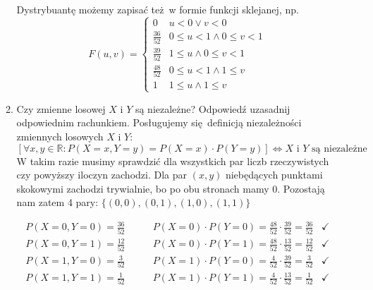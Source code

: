 \documentclass[twoside]{mwart}
\newenvironment{ansenv}{\comment}{\endcomment}
\newenvironment{ansenv}{\paragraph{Odpowiedź:}}{}
\begin{document}
\begin{enumerate}
\begin{enumerate}
\begin{ansenv}
	Dystrybuantę możemy zapisać też w formie funkcji sklejanej, np.
	\[F(u,v)=\begin{cases} 
	0 & u< 0 \lor v< 0 \\ 
	\frac{36}{52} & 0\leq u< 1 \land 0\leq v< 1 \\
	\frac{39}{52} & 1\leq u \land 0\leq v< 1 \\
	\frac{48}{52} & 0\leq u< 1 \land 1\leq v\\
	1 & 1\leq u \land 1\leq v
	\end{cases}\]
\end{ansenv}
\item Czy zmienne losowej $X$ i $Y$ są niezależne? Odpowiedź uzasadnij odpowiednim rachunkiem. 
\begin{ansenv}
	Posługujemy się definicją niezależności zmiennych losowych $X$ i $Y$:
	\[ \left[\forall x,y\in\mathbb{R}\colon P(X=x, Y=y)=P(X=x)\cdot P(Y=y) \right] \iff \text{$X$ i $Y$ są niezależne} \]
	W takim razie musimy sprawdzić dla wszystkich par liczb rzeczywistych czy powyższy iloczyn zachodzi.
	Dla par $(x, y)$ niebędących punktami skokowymi zachodzi trywialnie, bo po obu stronach mamy 0.
	Pozostają nam zatem 4 pary:  $\{(0,0), (0, 1), (1, 0), (1,1)\}$
	
	\begin{align*}
		P(X=0, Y=0)=\frac{36}{52} \qquad & P(X=0)\cdot P(Y=0)=\frac{48}{52}\cdot\frac{39}{52}=\frac{36}{52} & \checkmark \\
		P(X=0, Y=1)=\frac{12}{52} \qquad & P(X=0)\cdot P(Y=1)=\frac{48}{52}\cdot\frac{13}{52}=\frac{12}{52} & \checkmark \\
		P(X=1, Y=0)=\frac{3}{52} \qquad & P(X=1)\cdot P(Y=0)=\frac{4}{52}\cdot\frac{39}{52}=\frac{3}{52} & \checkmark \\
		P(X=1, Y=1)=\frac{1}{52} \qquad & P(X=1)\cdot P(Y=1)=\frac{4}{52}\cdot\frac{13}{52}=\frac{1}{52} & \checkmark \\
	\end{align*}


\end{ansenv}
\end{enumerate}
\end{enumerate}
\end{document}
